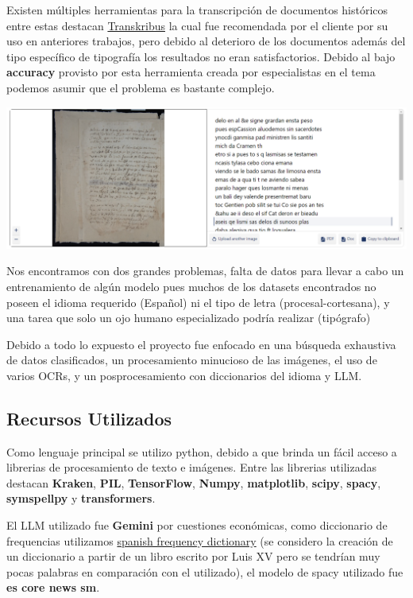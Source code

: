 \documentclass[11pt,a4paper]{article}
\begin{document}
Existen m\'ultiples herramientas para la transcripción de documentos hist\'oricos entre estas destacan \href{https://www.transkribus.org/}{Transkribus} la cual fue recomendada por el cliente por su uso en anteriores trabajos, pero debido al deterioro de los documentos adem\'as del tipo espec\'ifico de tipograf\'ia los resultados no eran satisfactorios. Debido al bajo \textbf{accuracy} provisto por esta herramienta creada por especialistas en el tema podemos asumir que el problema es bastante complejo.

\begin{center} \includegraphics[width=1.0\textwidth]{transkribus} \end{center}

Nos encontramos con dos grandes problemas, falta de datos para llevar a cabo un entrenamiento de alg\'un modelo pues muchos de los datasets encontrados no poseen el idioma requerido (Español) ni el tipo de letra (procesal-cortesana), y una tarea que solo un ojo humano especializado podr\'ia realizar (tip\'ografo)

Debido a todo lo expuesto el proyecto fue enfocado en una b\'usqueda exhaustiva de datos clasificados, un procesamiento minucioso de las im\'agenes, el uso de varios OCRs, y un posprocesamiento con diccionarios del idioma y LLM.

\subsection{Recursos Utilizados}

Como lenguaje principal se utilizo python, debido a que brinda un f\'acil acceso a librerias de procesamiento de texto e im\'agenes. Entre las librerias utilizadas destacan \textbf{Kraken}, \textbf{PIL}, \textbf{TensorFlow}, \textbf{Numpy},  \textbf{matplotlib}, \textbf{scipy}, \textbf{spacy}, \textbf{symspellpy} y \textbf{transformers}.

El LLM utilizado fue \textbf{Gemini} por cuestiones económicas, como diccionario de frequencias utilizamos \href{https://github.com/hermitdave/FrequencyWords/blob/master/content/2016/es/es_full.txt}{spanish frequency dictionary} (se considero la creaci\'on de un diccionario a partir de un libro escrito por Luis XV pero se tendr\'ian muy pocas palabras en comparaci\'on con el utilizado), el modelo de spacy utilizado fue \textbf{es core news sm}.
\end{document}
